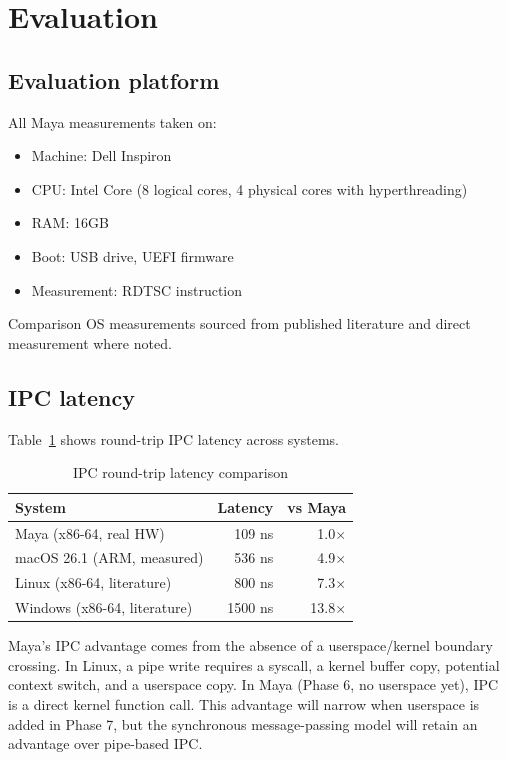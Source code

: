 \documentclass[letterpaper,twocolumn,10pt]{article}
\begin{document}
\section{Evaluation}

\subsection{Evaluation platform}

All Maya measurements taken on:
\begin{itemize}
\item Machine: Dell Inspiron
\item CPU: Intel Core (8 logical cores,
  4 physical cores with hyperthreading)
\item RAM: 16GB
\item Boot: USB drive, UEFI firmware
\item Measurement: RDTSC instruction
\end{itemize}

Comparison OS measurements sourced from
published literature and direct measurement
where noted.

\subsection{IPC latency}

Table~\ref{tab:ipc} shows round-trip IPC
latency across systems.

\begin{table}[h]
\centering
\caption{IPC round-trip latency comparison}
\label{tab:ipc}
\begin{tabular}{lrr}
\toprule
System & Latency & vs Maya \\
\midrule
Maya (x86-64, real HW) & 109 ns & 1.0$\times$ \\
macOS 26.1 (ARM, measured) & 536 ns & 4.9$\times$ \\
Linux (x86-64, literature) & 800 ns & 7.3$\times$ \\
Windows (x86-64, literature) & 1500 ns & 13.8$\times$ \\
\bottomrule
\end{tabular}
\end{table}

Maya's IPC advantage comes from the absence
of a userspace/kernel boundary crossing.
In Linux, a pipe write requires a syscall,
a kernel buffer copy, potential context switch,
and a userspace copy. In Maya (Phase 6, no
userspace yet), IPC is a direct kernel function
call. This advantage will narrow when userspace
is added in Phase 7, but the synchronous
message-passing model will retain an advantage
over pipe-based IPC.
\end{document}
